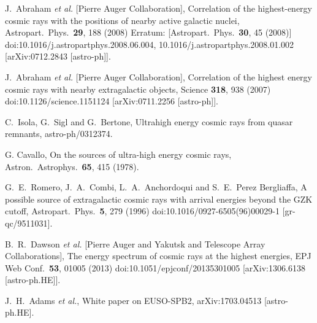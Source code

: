\documentclass[aps,prd,twocolumn,superscriptaddress,tightenlines,nofootinbib]{revtex4-1}
\begin{document}
\begin{thebibliography}{99}
  J.~Abraham {\it et al.} [Pierre Auger Collaboration],
     {\color{rossoCP3}  Correlation of the highest-energy cosmic rays with the positions of nearby active galactic nuclei},
  Astropart.\ Phys.\  {\bf 29}, 188 (2008)
  Erratum: [Astropart.\ Phys.\  {\bf 30}, 45 (2008)]
  doi:10.1016/j.astropartphys.2008.06.004, 10.1016/j.astropartphys.2008.01.002
  [arXiv:0712.2843 [astro-ph]].


  J.~Abraham {\it et al.} [Pierre Auger Collaboration],
     {\color{rossoCP3}  Correlation of the highest energy cosmic rays with nearby extragalactic objects},
  Science {\bf 318}, 938 (2007)
  doi:10.1126/science.1151124
  [arXiv:0711.2256 [astro-ph]].




  C.~Isola, G.~Sigl and G.~Bertone,
    {\color{rossoCP3}  Ultrahigh energy cosmic rays from quasar remnants},
  astro-ph/0312374.

G. Cavallo,
  {\color{rossoCP3} On the sources of ultra-high energy cosmic rays},
Astron.\ Astrophys.\ {\bf 65}, 415 (1978).

  G.~E.~Romero, J.~A.~Combi, L.~A.~Anchordoqui and S.~E.~Perez Bergliaffa,
    {\color{rossoCP3} A possible source of extragalactic cosmic rays with arrival energies beyond the GZK cutoff},
  Astropart.\ Phys.\  {\bf 5}, 279 (1996)
  doi:10.1016/0927-6505(96)00029-1
  [gr-qc/9511031].


  B.~R.~Dawson {\it et al.} [Pierre Auger and Yakutsk and Telescope Array Collaborations],
   {\color{rossoCP3}  The energy spectrum of cosmic rays at the highest energies},
  EPJ Web Conf.\  {\bf 53}, 01005 (2013)
  doi:10.1051/epjconf/20135301005
  [arXiv:1306.6138 [astro-ph.HE]].


  J.~H.~Adams {\it et al.},
  {\color{rossoCP3}  White paper on EUSO-SPB2},
  arXiv:1703.04513 [astro-ph.HE].









\end{thebibliography}
\end{document}
